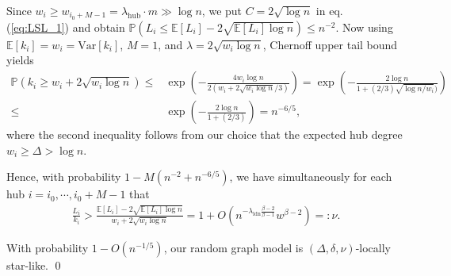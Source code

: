 \documentclass[a4paper]{article}
\theoremstyle{plain}
\theoremstyle{definition}
\newcommand{\E}{\mathbb{E}}
\newcommand{\PP}{\mathbb{P}}
\begin{document}
Since $w_i\geq w_{i_0+M-1} = \lambda_{\mathrm{hub}} \cdot m \gg \log n$, we put $C = 2\sqrt{\log n}$ in eq. (\ref{eq:LSL_1}) and obtain $\PP(L_i \leq \E[L_i] - 2\sqrt{\E[L_i]\log n}) \leq n^{-2}.$ Now using $\E[ k_i]=w_i=\mathrm{Var}[ k_i]$, $M=1$, and $\lambda=2\sqrt{w_i\log n}$, Chernoff upper tail bound \cite[Theorem 2.6]{Chung_2006} yields
\begin{align*}
	\PP( k_i\geq w_i + 2\sqrt{w_i\log n}) \leq& \exp\left(-\frac{4w_i \log n}{2(w_i + 2\sqrt{w_i \log n}/3)}\right) = \exp\left(-\frac{2 \log n}{1 + (2/3)\sqrt{ \log n / w_i})}\right) \\
	\leq& \exp\left(-\frac{2 \log n}{1 + (2/3)}\right)  = n^{-6/5},
\end{align*}
where the second inequality follows from our choice that the expected hub degree $w_i\geq \Delta>\log n$.

Hence, with probability $1-M(n^{-2}+n^{-6/5})$, we have simultaneously for each hub $i=i_0,\cdots,i_0+M-1$ that
\begin{align*}
	\frac{L_i}{ k_i} > \frac{\E[L_i] - 2\sqrt{\E[L_i]\log n}}{w_i + 2\sqrt{w_i\log n}} =1+O( n^{-\lambda_{\mathrm{ldn}}\frac{\beta-2}{\beta-1}} w^{\beta-2}) =: \nu.
\end{align*}

With probability $1-O(n^{-1/5})$, our random graph model is $(\Delta,\delta,\nu)$-locally star-like. \qed
\end{document}
